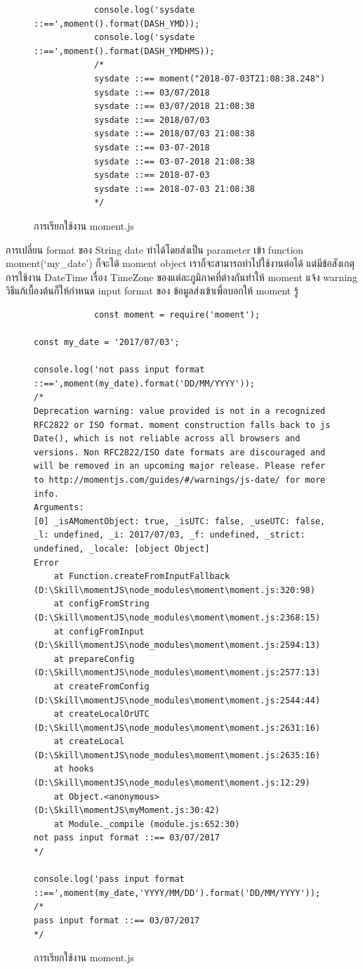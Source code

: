 \begin{enumerate}
\begin{figure}[H]
{\begin{lstlisting}
			console.log('sysdate ::==',moment().format(DASH_YMD));
			console.log('sysdate ::==',moment().format(DASH_YMDHMS));
			/*
			sysdate ::== moment("2018-07-03T21:08:38.248")
			sysdate ::== 03/07/2018
			sysdate ::== 03/07/2018 21:08:38
			sysdate ::== 2018/07/03
			sysdate ::== 2018/07/03 21:08:38
			sysdate ::== 03-07-2018
			sysdate ::== 03-07-2018 21:08:38
			sysdate ::== 2018-07-03
			sysdate ::== 2018-07-03 21:08:38
			*/
		\end{lstlisting}}
	\centering
		\caption{การเรียกใช้งาน moment.js}
		\label{Fig:API Web Speech}
	\end{figure}
	การเปลี่ยน format ของ String date ทำได้โดยส่งเป็น parameter เข้า function moment(‘my_date’) ก็จะได้ moment object เราก็จะสามารถทำไปใช้งานต่อได้ แต่มีข้อสังเกตุ การใช้งาน DateTime เรื่อง TimeZone ของแต่ละภูมิภาคที่ต่างกันทำให้ moment แจ้ง warning วิธีแก้เบื้องต้นก็ให้กำหนด input format ของ ข้อมูลส่งเข้าเพื่อบอกให้ moment รู้
	\begin{figure}[H]
		{\begin{lstlisting}
			const moment = require('moment');

const my_date = '2017/07/03';

console.log('not pass input format ::==',moment(my_date).format('DD/MM/YYYY'));
/*
Deprecation warning: value provided is not in a recognized RFC2822 or ISO format. moment construction falls back to js Date(), which is not reliable across all browsers and versions. Non RFC2822/ISO date formats are discouraged and will be removed in an upcoming major release. Please refer to http://momentjs.com/guides/#/warnings/js-date/ for more info.
Arguments:
[0] _isAMomentObject: true, _isUTC: false, _useUTC: false, _l: undefined, _i: 2017/07/03, _f: undefined, _strict: undefined, _locale: [object Object]
Error
    at Function.createFromInputFallback (D:\Skill\momentJS\node_modules\moment\moment.js:320:98)
    at configFromString (D:\Skill\momentJS\node_modules\moment\moment.js:2368:15)
    at configFromInput (D:\Skill\momentJS\node_modules\moment\moment.js:2594:13)
    at prepareConfig (D:\Skill\momentJS\node_modules\moment\moment.js:2577:13)
    at createFromConfig (D:\Skill\momentJS\node_modules\moment\moment.js:2544:44)
    at createLocalOrUTC (D:\Skill\momentJS\node_modules\moment\moment.js:2631:16)
    at createLocal (D:\Skill\momentJS\node_modules\moment\moment.js:2635:16)
    at hooks (D:\Skill\momentJS\node_modules\moment\moment.js:12:29)
    at Object.<anonymous> (D:\Skill\momentJS\myMoment.js:30:42)
    at Module._compile (module.js:652:30)
not pass input format ::== 03/07/2017
*/

console.log('pass input format ::==',moment(my_date,'YYYY/MM/DD').format('DD/MM/YYYY'));
/*
pass input format ::== 03/07/2017
*/
		\end{lstlisting}}
	\centering
		\caption{การเรียกใช้งาน moment.js}
		\label{Fig:API Web Speech}
	\end{figure}

\end{enumerate}

